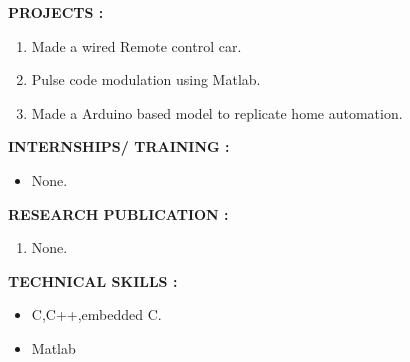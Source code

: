 \documentclass{article}
\begin{document}
	\textbf{PROJECTS :}
	\begin{enumerate}
		\item Made a wired Remote control car.
		\item Pulse code modulation using Matlab.
		\item Made a Arduino based model to replicate home automation.
	\end{enumerate}

	\textbf{INTERNSHIPS/ TRAINING :}
	\begin{itemize}
		\item None.
	\end{itemize}
	
		\textbf{RESEARCH PUBLICATION :}
		\begin{enumerate}
			\item None.
		\end{enumerate}
		
		\newpage
		
			\textbf{TECHNICAL SKILLS :}
			\begin{itemize}	
				\item C,C++,embedded C.
				\item Matlab 
				\end{itemize}
				
				
	
\end{document}
